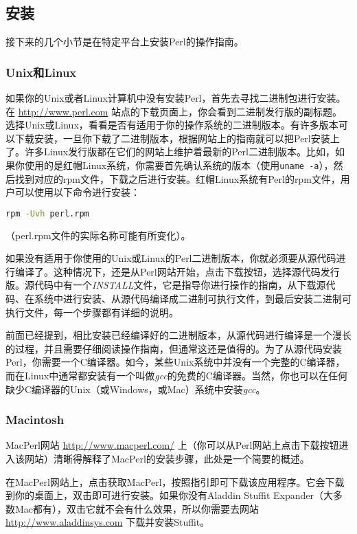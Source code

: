 \subsection{安装}
接下来的几个小节是在特定平台上安装Perl的操作指南。

\subsubsection{Unix和Linux}
如果你的Unix或者Linux计算机中没有安装Perl，首先去寻找二进制包进行安装。在 \href{http://www.perl.com}{http://www.perl.com} 站点的下载页面上，你会看到二进制发行版的副标题。选择Unix或Linux，看看是否有适用于你的操作系统的二进制版本。有许多版本可以下载安装，一旦你下载了二进制版本，根据网站上的指南就可以把Perl安装上了。许多Linux发行版都在它们的网站上维护着最新的Perl二进制版本。比如，如果你使用的是红帽Linux系统，你需要首先确认系统的版本（使用\verb|uname -a|），然后找到对应的rpm文件，下载之后进行安装。红帽Linux系统有Perl的rpm文件，用户可以使用以下命令进行安装：

\begin{lstlisting}[language=bash]
rpm -Uvh perl.rpm
\end{lstlisting}
\noindent （perl.rpm文件的实际名称可能有所变化）。

如果没有适用于你使用的Unix或Linux的Perl二进制版本，你就必须要从源代码进行编译了。这种情况下，还是从Perl网站开始，点击下载按钮，选择源代码发行版。源代码中有一个\textit{INSTALL}文件，它是指导你进行操作的指南，从下载源代码、在系统中进行安装、从源代码编译成二进制可执行文件，到最后安装二进制可执行文件，每一个步骤都有详细的说明。

前面已经提到，相比安装已经编译好的二进制版本，从源代码进行编译是一个漫长的过程，并且需要仔细阅读操作指南，但通常这还是值得的。为了从源代码安装Perl，你需要一个C编译器。如今，某些Unix系统中并没有一个完整的C编译器，而在Linux中通常都安装有一个叫做\textit{gcc}的免费的C编译器。当然，你也可以在任何缺少C编译器的Unix（或Windows，或Mac）系统中安装\textit{gcc}。

\subsubsection{Macintosh}
MacPerl网站 \href{http://www.macperl.com/}{http://www.macperl.com/} 上（你可以从Perl网站上点击下载按钮进入该网站）清晰得解释了MacPerl的安装步骤，此处是一个简要的概述。

在MacPerl网站上，点击获取MacPerl，按照指引即可下载该应用程序。它会下载到你的桌面上，双击即可进行安装。如果你没有Aladdin Stuffit Expander（大多数Mac都有），双击它就不会有什么效果，所以你需要去网站 \href{http://www.aladdinsys.com}{http://www.aladdinsys.com} 下载并安装Stuffit。

